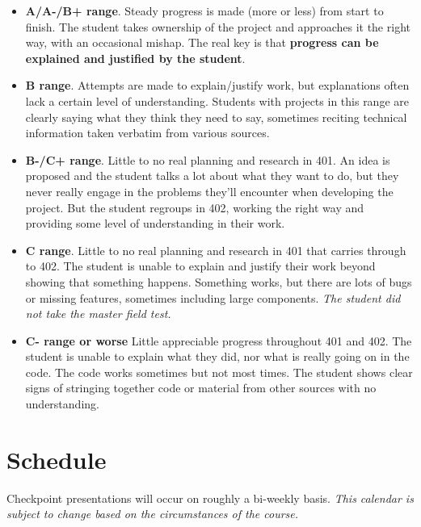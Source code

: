 \documentclass[]{article}
\begin{document}
\begin{itemize}
\item \textbf{A/A-/B+ range}. Steady progress is made (more or less)
  from start to finish. The student takes ownership of the project and
  approaches it the right way, with an occasional mishap. The real key
  is that \textbf{progress can be explained and justified by the
    student}.
\item \textbf{B range}. Attempts are made to explain/justify work, but
  explanations often lack a certain level of understanding. Students
  with projects in this range are clearly saying what they think they
  need to say, sometimes reciting technical information taken verbatim
  from various sources.
\item \textbf{B-/C+ range}. Little to no real planning and research in
  401. An idea is proposed and the student talks a lot about what they
  want to do, but they never really engage in the problems they'll
  encounter when developing the project. But the student regroups in
  402, working the right way and providing some level of understanding
  in their work.
\item \textbf{C range}. Little to no real planning and research in 401
  that carries through to 402. The student is unable to explain and
  justify their work beyond showing that something happens. Something
  works, but there are lots of bugs or missing features, sometimes
  including large components. \textit{The student did not take the master field test.}
\item \textbf{C- range or worse} Little appreciable progress
  throughout 401 and 402. The student is unable to explain what they
  did, nor what is really going on in the code. The code works
  sometimes but not most times. The student shows clear signs of
  stringing together code or material from other sources with no
  understanding.
\end{itemize}


\section{Schedule}

Checkpoint presentations will occur on roughly a bi-weekly basis.  \textit{This calendar is subject to change based on the circumstances of the course.}
\end{document}
